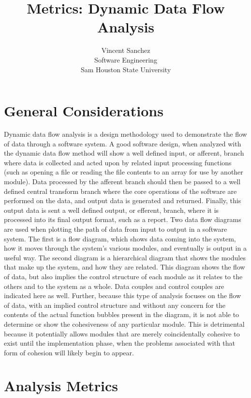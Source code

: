\documentclass{article}
\title{Metrics: Dynamic Data Flow Analysis}
\author{Vincent Sanchez \\ Software Engineering \\ Sam Houston State University}
\begin{document}
\maketitle
\newpage

\tableofcontents
\newpage

\section{General Considerations}
	Dynamic data flow analysis is a design methodology used to demonstrate the flow of data through a software system. A good software design, when analyzed with the dynamic data flow method will show a well defined input, or afferent, branch where data is collected and acted upon by related input processing functions (such as opening a file or reading the file contents to an array for use by another module). Data processed by the afferent branch should then be passed to a well defined central transform branch where the core operations of the software are performed on the data, and output data is generated and returned. Finally, this output data is sent a well defined output, or efferent, branch, where it is processed into its final output format, such as a report. Two data flow diagrams are used when plotting the path of data from input to output in a software system. The first is a flow diagram, which shows data coming into the system, how it moves through the system's various modules, and eventually is output in a useful way. The second diagram is a hierarchical diagram that shows the modules that make up the system, and how they are related. This diagram shows the flow of data, but also implies the control structure of each module as it relates to the others and to the system as a whole. Data couples and control couples are indicated here as well. Further, because this type of analysis focuses on the flow of data, with an implied control structure and without any concern for the contents of the actual function bubbles present in the diagram, it is not able to determine or show the cohesiveness of any particular module. This is detrimental because it potentially allows modules that are merely coincidentally cohesive to exist until the implementation phase, when the problems associated with that form of cohesion will likely begin to appear. 
\section{Analysis Metrics}
\end{document}
